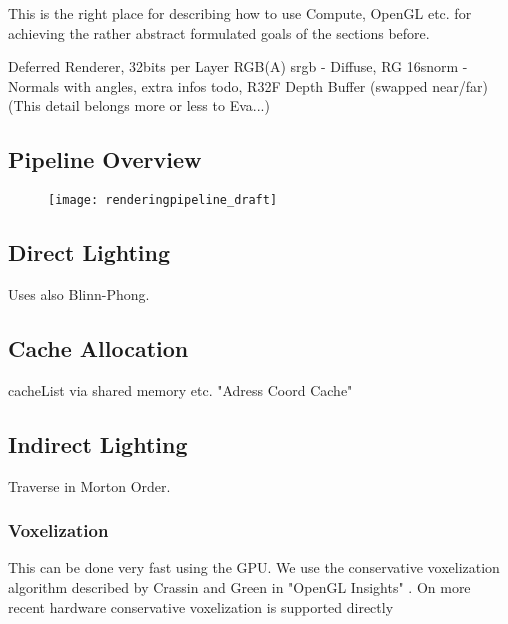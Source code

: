 \documentclass[thesis.tex]{subfiles}
\begin{document}
This is the right place for describing how to use Compute, OpenGL etc. for achieving the rather abstract formulated goals of the sections before.

Deferred Renderer, 32bits per Layer RGB(A) srgb - Diffuse, RG 16snorm - Normals with angles, extra infos todo, R32F Depth Buffer (swapped near/far)\\
(This detail belongs more or less to Eva...)

\subsection{Pipeline Overview}

\begin{figure}[h]
	\centering
	\texttt{[image: renderingpipeline\_draft]}
\end{figure}



\subsection{Direct Lighting}
Uses also Blinn-Phong.

\subsection{Cache Allocation} \label{sec:impl:cachealloc}
cacheList via shared memory etc.
"Adress Coord Cache"

\subsection{Indirect Lighting}

Traverse in Morton Order.

\subsubsection{Voxelization}
This can be done very fast using the GPU.
We use the conservative voxelization algorithm described by Crassin and Green in "OpenGL Insights" \cite{bib:openglinsightsvoxel}.
On more recent hardware conservative voxelization is supported directly

\subfilebib %
\end{document}
